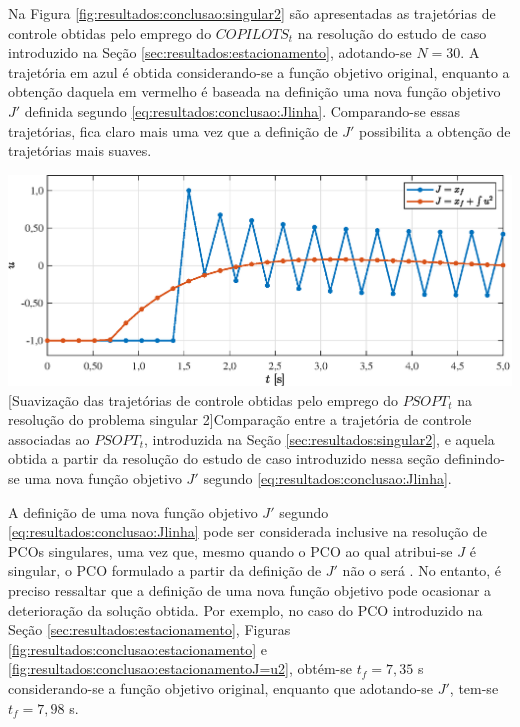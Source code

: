 Na Figura \ref{fig:resultados:conclusao:singular2} são apresentadas as trajetórias de controle obtidas pelo emprego do $ COPILOTS_t $ na resolução do estudo de caso introduzido na Seção \ref{sec:resultados:estacionamento}, adotando-se $ N = 30 $. A trajetória em azul é obtida considerando-se a função objetivo original, enquanto a obtenção daquela em vermelho é baseada na definição uma nova função objetivo $ J' $ definida segundo \eqref{eq:resultados:conclusao:Jlinha}. Comparando-se essas trajetórias, fica claro mais uma vez que a definição de $ J' $ possibilita a obtenção de trajetórias mais suaves. 

\noindent	
\begin{minipage}{\textwidth}
	\vspace{\onelineskip}
	\centering
	\includegraphics[width=1\linewidth]{fig/resultados/obs/J=u2/singular2}
	[Suavização das trajetórias de controle obtidas pelo emprego do $ PSOPT_t $ na resolução do problema singular 2]{Comparação entre a trajetória de controle associadas ao $ PSOPT_t $, introduzida na Seção \ref{sec:resultados:singular2}, e aquela obtida a partir da resolução do estudo de caso introduzido nessa seção definindo-se uma nova função objetivo $ J' $ segundo \eqref{eq:resultados:conclusao:Jlinha}.}
	\label{fig:resultados:conclusao:singular2}
	\vspace{\onelineskip}
\end{minipage}

A definição de uma nova função objetivo $ J' $ segundo \eqref{eq:resultados:conclusao:Jlinha} pode ser considerada inclusive na resolução de PCOs singulares, uma vez que, mesmo quando o PCO ao qual atribui-se $ J $ é singular, o PCO formulado a partir da definição de $ J' $ não o será \cite{jacobson_computation_1970}. No entanto, é preciso ressaltar que a definição de uma nova função objetivo pode ocasionar a deterioração da solução obtida. Por exemplo, no caso do PCO introduzido na Seção \ref{sec:resultados:estacionamento}, Figuras \ref{fig:resultados:conclusao:estacionamento} e \ref{fig:resultados:conclusao:estacionamentoJ=u2}, obtém-se $ t_f = 7,35$ s considerando-se a função objetivo original, enquanto que adotando-se $ J' $, tem-se $ t_f = 7,98 $ s.